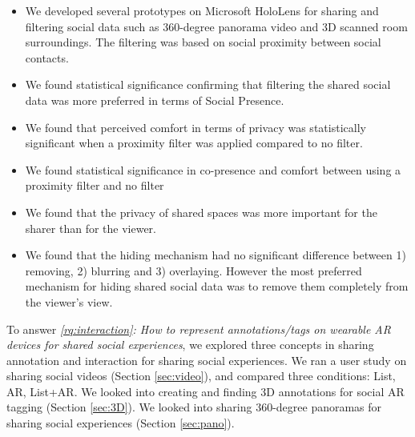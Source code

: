 \begin{itemize}
    \item{We developed several prototypes on Microsoft HoloLens for sharing and filtering social data such as 360-degree panorama video and 3D scanned room surroundings. The filtering was based on social proximity between social contacts.}
    \item{We found statistical significance confirming that filtering the shared social data was more preferred in terms of Social Presence.}
    \item{We found that perceived comfort in terms of privacy was statistically significant when a proximity filter was applied compared to no filter.}
    \item{We found statistical significance in co-presence and comfort between using a proximity filter and no filter}
    \item{We found that the privacy of shared spaces was more important for the sharer than for the viewer.}
    \item{We found that the hiding mechanism had no significant difference between 1) removing, 2) blurring and 3) overlaying. However the most preferred mechanism for hiding shared social data was to remove them completely from the viewer's view.}
\end{itemize}

To answer \textit{\ref{rq:interaction}: How to represent annotations/tags on wearable AR devices for shared social experiences}, we explored three concepts in sharing annotation and interaction for sharing social experiences. We ran a user study on sharing social videos (Section \ref{sec:video}), and compared three conditions: List, AR, List+AR. We looked into creating and finding 3D annotations for social AR tagging (Section \ref{sec:3D}). We looked into sharing 360-degree panoramas for sharing social experiences (Section \ref{sec:pano}). 

